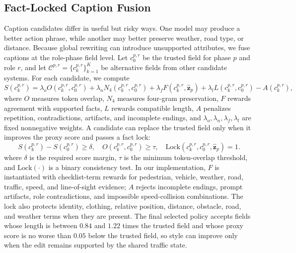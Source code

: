 \documentclass[runningheads]{llncs}
\begin{document}
\subsection{Fact-Locked Caption Fusion}

Caption candidates differ in useful but risky ways. One model may produce a better action phrase, while another may better preserve weather, road type, or distance. Because global rewriting can introduce unsupported attributes, we fuse captions at the role-phase field level. Let $c_0^{p,r}$ be the trusted field for phase $p$ and role $r$, and let $\mathcal{C}^{p,r}=\{c_k^{p,r}\}_{k=1}^{K}$ be alternative fields from other candidate systems. For each candidate, we compute
\begin{equation}
    S(c_k^{p,r})
    =
    \lambda_o O(c_k^{p,r},c_0^{p,r})
    + \lambda_n N_4(c_k^{p,r},c_0^{p,r})
    + \lambda_f F(c_k^{p,r},\widehat{\mathbf{z}}_{p})
    + \lambda_l L(c_k^{p,r},c_0^{p,r})
    - A(c_k^{p,r}),
    \label{eq:caption_score}
\end{equation}
where $O$ measures token overlap, $N_4$ measures four-gram preservation, $F$ rewards agreement with supported facts, $L$ rewards compatible length, $A$ penalizes repetition, contradictions, artifacts, and incomplete endings, and $\lambda_o,\lambda_n,\lambda_f,\lambda_l$ are fixed nonnegative weights. A candidate can replace the trusted field only when it improves the proxy score and passes a fact lock:
\begin{equation}
    S(c_k^{p,r})-S(c_0^{p,r})\geq\delta,\quad
    O(c_k^{p,r},c_0^{p,r})\geq\tau,\quad
    \mathrm{Lock}(c_k^{p,r},c_0^{p,r},\widehat{\mathbf{z}}_{p})=1.
    \label{eq:caption_gate}
\end{equation}
where $\delta$ is the required score margin, $\tau$ is the minimum token-overlap threshold, and $\mathrm{Lock}(\cdot)$ is a binary consistency test. In our implementation, $F$ is instantiated with checklist-term rewards for pedestrian, vehicle, weather, road, traffic, speed, and line-of-sight evidence; $A$ rejects incomplete endings, prompt artifacts, role contradictions, and impossible speed-collision combinations. The lock also protects identity, clothing, relative position, distance, obstacle, road, and weather terms when they are present. The final selected policy accepts fields whose length is between $0.84$ and $1.22$ times the trusted field and whose proxy score is no worse than $0.05$ below the trusted field, so style can improve only when the edit remains supported by the shared traffic state.
\end{document}
